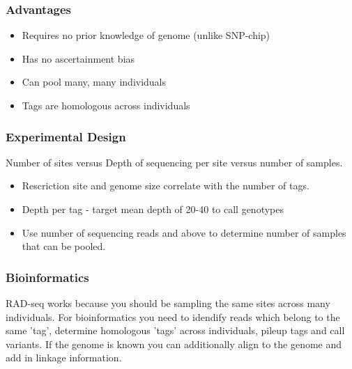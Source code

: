 \documentclass[pdf]{beamer}
\begin{document}
\begin{frame}
\frametitle{Advantages}
\begin{itemize}
\item Requires no prior knowledge of genome (unlike SNP-chip)
\item Has no ascertainment bias
\item Can pool many, many individuals
\item Tags are homologous across individuals
\end{itemize}
\end{frame}

\begin{frame}
\frametitle{Experimental Design}
Number of sites versus Depth of sequencing per site versus number of samples.
\begin{itemize}
\item Rescriction site and genome size correlate with the number of tags.
\item Depth per tag - target mean depth of 20-40 to call genotypes
\item Use number of sequencing reads and above to determine number of samples that can be pooled.
\end{itemize}
\end{frame}

\begin{frame}
\frametitle{Bioinformatics}
RAD-seq works because you should be sampling the same sites across many individuals. For bioinformatics you need to idendify reads which belong to the same 'tag', determine homologous 'tags' across individuals, pileup tags and call variants. If the genome is known you can additionally align to the genome and add in linkage information.
\end{frame}
\end{document}
